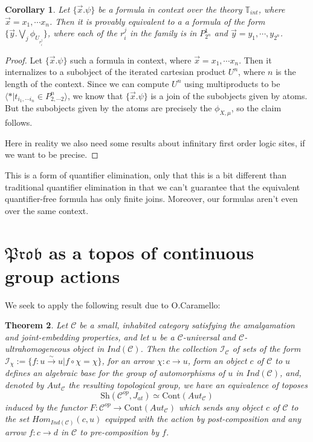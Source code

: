 \documentclass[a4paper]{amsproc}
\theoremstyle{plain}
\newtheorem{theorem}{Theorem}[section]
\newtheorem{corollary}[theorem]{Corollary}
\theoremstyle{definition}
\theoremstyle{remark}
\numberwithin{equation}{section}
\begin{document}
\begin{corollary}
    Let $\{ \vec{x} . \psi\}$ be a formula in context over the theory $\mathbb{T}_{int}$, where $\vec{x} = x_1, \cdots x_n$. Then it is provably equivalent to a a formula of the form $\{\vec{y} . \bigvee_j \phi_{U_{r_i^j}} \}$, where each of the $r_i^j$ in the family is in $P^1_{2^n}$ and $\vec{y} = y_1,\cdots,y_{2^n}$.
\end{corollary}
\begin{proof}
    Let $\{ \vec{x} . \psi\}$ such a formula in context, where $\vec{x} = x_1, \cdots x_n$. Then it internalizes to a subobject of the iterated cartesian product $U^n$, where $n$ is the length of the context. Since we can compute $U^n$ using multiproducts to be $\langle * | t_{i_1,\cdots i_n} \in P^n_{2,\cdots 2} \rangle$, we know that $\{ \vec{x} . \psi\}$ is a join of the subobjects given by atoms. But the subobjects given by the atoms are precisely the $\phi_{X,\mu}$, so the claim follows.

    Here in reality we also need some results about infinitary first order logic sites, if we want to be precise.
\end{proof}

This is a form of quantifier elimination, only that this is a bit different than traditional quantifier elimination in that we can't guarantee that the equivalent quantifier-free formula has only finite joins. Moreover, our formulas aren't even over the same context.

\section{$\mathfrak{Prob}$ as a topos of continuous group actions}

We seek to apply the following result due to O.Caramello:

\begin{theorem}\label{olivia}
Let $\mathcal{C}$ be a small, inhabited category satisfying the amalgamation and joint-embedding properties, and let $u$ be a $\mathcal{C}$-universal and $\mathcal{C}$-ultrahomogeneous object in $Ind(\mathcal{C})$. Then the collection $\mathcal{I}_{\mathcal{C}}$ of sets of the form $\mathcal{I}_{\chi}:=\{f:u\overset{\sim}{\rightarrow} u| f\circ \chi=\chi\} $, for an arrow $\chi:c\rightarrow u$, form an object $c$ of $\mathcal{C}$ to $u$ defines an algebraic base for the group of automorphisms of $u$ in $Ind(\mathcal{C})$, and, denoted by $Aut_\mathcal{C}$ the resulting topological group, we have an equivalence of toposes
\[\text{Sh}(\mathcal{C}^{op},J_{at})\simeq \text{Cont}(Aut_\mathcal{C}) \]
induced by the functor $F:\mathcal{C}^{op}\rightarrow \text{Cont}(Aut_{\mathcal{C}})$ which sends any object $c$ of $\mathcal{C}$ to the set $Hom_{Ind(\mathcal{C})}(c,u)$ equipped with the action by post-composition and any arrow $f:c\rightarrow d$ in $\mathcal{C}$ to pre-composition by $f$.
\end{theorem}
\end{document}
